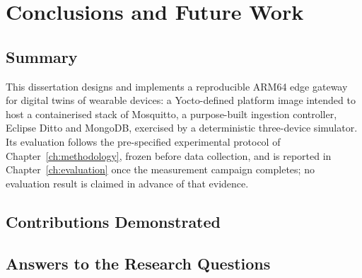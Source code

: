 
\chapter{Conclusions and Future Work}
\label{ch:conclusions}

\section{Summary}
\label{sec:concl-summary}

\noindent This dissertation designs and implements a reproducible ARM64 edge
gateway for digital twins of wearable devices: a Yocto-defined platform
image intended to host a containerised stack of Mosquitto, a purpose-built
ingestion controller, Eclipse Ditto and MongoDB, exercised by a
deterministic three-device simulator. Its evaluation follows the
pre-specified experimental protocol of Chapter~\ref{ch:methodology}, frozen
before data collection, and is reported in Chapter~\ref{ch:evaluation} once
the measurement campaign completes; no evaluation result is claimed in
advance of that evidence.

\section{Contributions Demonstrated}
\label{sec:concl-contributions}

\noindent {}

\section{Answers to the Research Questions}
\label{sec:concl-rqs}

\noindent {}

